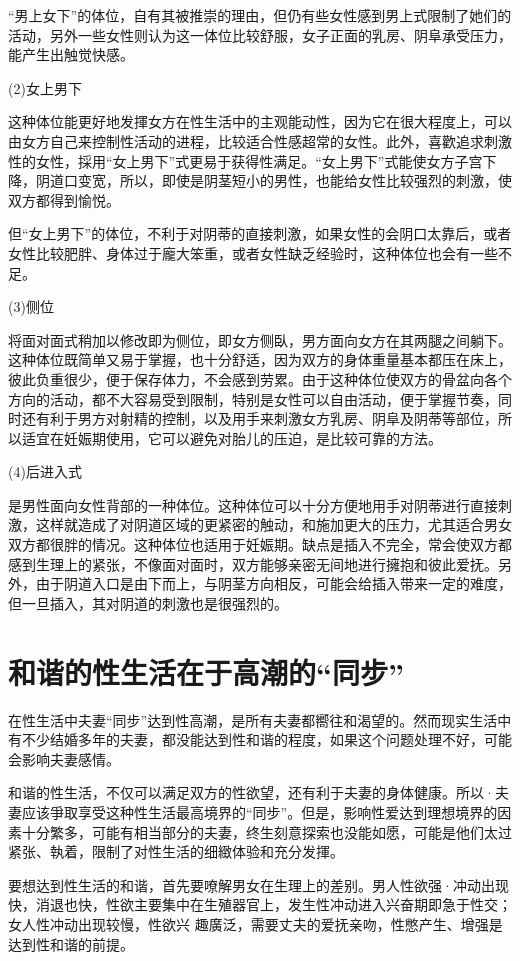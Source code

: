 \documentclass[12pt,UTF8]{ctexbook}
\begin{document}
“男上女下”的体位，自有其被推崇的理由，但仍有些女性感到男上式限制了她们的活动，另外一些女性则认为这一体位比较舒服，女子正面的乳房、阴阜承受压力，能产生出触觉快感。

(2)女上男下

这种体位能更好地发揮女方在性生活中的主观能动性，因为它在很大程度上，可以由女方自己来控制性活动的进程，比较适合性感超常的女性。此外，喜歡追求刺激性的女性，採用“女上男下”式更易于获得性满足。“女上男下”式能使女方子宫下降，阴道口变宽，所以，即使是阴茎短小的男性，也能给女性比较强烈的刺激，使双方都得到愉悦。

但“女上男下”的体位，不利于对阴蒂的直接刺激，如果女性的会阴口太靠后，或者女性比较肥胖、身体过于龐大笨重，或者女性缺乏经验时，这种体位也会有一些不足。

(3)侧位

将面对面式稍加以修改即为侧位，即女方侧臥，男方面向女方在其两腿之间躺下。这种体位既简单又易于掌握，也十分舒适，因为双方的身体重量基本都压在床上，彼此负重很少，便于保存体力，不会感到劳累。由于这种体位使双方的骨盆向各个方向的活动，都不大容易受到限制，特别是女性可以自由活动，便于掌握节奏，同时还有利于男方对射精的控制，以及用手来刺激女方乳房、阴阜及阴蒂等部位，所以适宜在妊娠期使用，它可以避免对胎儿的压迫，是比较可靠的方法。

(4)后进入式

是男性面向女性背部的一种体位。这种体位可以十分方便地用手对阴蒂进行直接刺激，这样就造成了对阴道区域的更紧密的触动，和施加更大的压力，尤其适合男女双方都很胖的情况。这种体位也适用于妊娠期。缺点是插入不完全，常会使双方都感到生理上的紧张，不像面对面时，双方能够亲密无间地进行擁抱和彼此爱抚。另外，由于阴道入口是由下而上，与阴茎方向相反，可能会给插入带来一定的难度，但一旦插入，其对阴道的刺激也是很强烈的。

\section{和谐的性生活在于高潮的“同步”}

在性生活中夫妻“同步”达到性高潮，是所有夫妻都嚮往和渴望的。然而现实生活中有不少结婚多年的夫妻，都没能达到性和谐的程度，如果这个问题处理不好，可能会影响夫妻感情。

和谐的性生活，不仅可以满足双方的性欲望，还有利于夫妻的身体健康。所以·夫妻应该爭取享受这种性生活最高境界的“同步”。但是，影响性爱达到理想境界的因素十分繁多，可能有相当部分的夫妻，终生刻意探索也没能如愿，可能是他们太过紧张、執着，限制了对性生活的细緻体验和充分发揮。

要想达到性生活的和谐，首先要嘹解男女在生理上的差别。男人性欲强·冲动出现快，消退也快，性欲主要集中在生殖器官上，发生性冲动进入兴奋期即急于性交；女人性冲动出现较慢，性欲兴
趣廣泛，需要丈夫的爱抚亲吻，性憋产生、增强是达到性和谐的前提。
\end{document}
